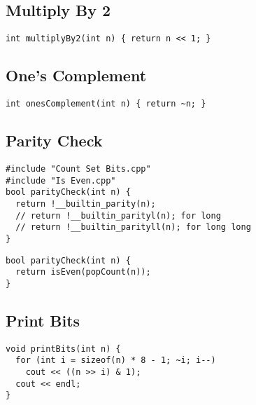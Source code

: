 \documentclass[twoside]{article}
\newcommand{\fileTitleStyle}{\large\underline}
\begin{document}
\begin{multicols*}{2}
\subsection*{Multiply By 2}
\begin{verbatim}
int multiplyBy2(int n) { return n << 1; }
\end{verbatim}

\subsectionfont{\centering\bfseries\LARGE}
\subsectionfont{\fileTitleStyle}
\subsection*{One's Complement}
\begin{verbatim}
int onesComplement(int n) { return ~n; }
\end{verbatim}

\subsectionfont{\centering\bfseries\LARGE}
\subsectionfont{\fileTitleStyle}
\subsection*{Parity Check}
\begin{verbatim}
#include "Count Set Bits.cpp"
#include "Is Even.cpp"
bool parityCheck(int n) {
  return !__builtin_parity(n);
  // return !__builtin_parityl(n); for long
  // return !__builtin_parityll(n); for long long
}
\end{verbatim}
\vspace{-12pt}
\begin{verbatim}
bool parityCheck(int n) {
  return isEven(popCount(n));
}
\end{verbatim}

\subsectionfont{\centering\bfseries\LARGE}
\subsectionfont{\fileTitleStyle}
\subsection*{Print Bits}
\begin{verbatim}
void printBits(int n) {
  for (int i = sizeof(n) * 8 - 1; ~i; i--)
    cout << ((n >> i) & 1);
  cout << endl;
}
\end{verbatim}

\subsectionfont{\centering\bfseries\LARGE}
\subsectionfont{\fileTitleStyle}

\end{multicols*}
\end{document}
